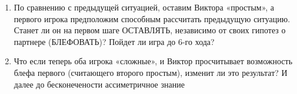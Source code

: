 \begin{problem}
\begin{enumerate}
\item По сравнению с предыдущей ситуацией, оставим Виктора
«простым», а первого игрока предположим способным
рассчитать предыдущую ситуацию. Станет ли он на первом шаге
ОСТАВЛЯТЬ, независимо от своих гипотез о партнере
(БЛЕФОВАТЬ)? Пойдет ли игра до 6-го хода?

\item Что если теперь оба игрока «сложные», и Виктор просчитывает
возможность блефа первого (считающего второго простым),
изменит ли это результат? {\red И далее до бесконечености ассиметричное знание}
\end{enumerate}





\begin{sol}

\end{sol}
\end{problem}




